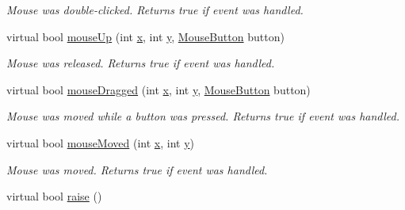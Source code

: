 \begin{DoxyCompactItemize}
\begin{DoxyCompactList}\small\item\em Mouse was double-\/clicked. Returns true if event was handled. \end{DoxyCompactList}\item 
\hypertarget{classGUI_1_1ToplevelWindow_ac6bba97e704f4a04ca37828ccf4b7061}{virtual bool \hyperlink{classGUI_1_1ToplevelWindow_ac6bba97e704f4a04ca37828ccf4b7061}{mouse\-Up} (int \hyperlink{classGUI_1_1Window_a6ca6a80ca00c9e1d8ceea8d3d99a657d}{x}, int \hyperlink{classGUI_1_1Window_a0ee8e923aff2c3661fc2e17656d37adf}{y}, \hyperlink{namespaceGUI_ad06082a7b02aa73697f39eb8e0856de9}{Mouse\-Button} button)}\label{classGUI_1_1ToplevelWindow_ac6bba97e704f4a04ca37828ccf4b7061}

\begin{DoxyCompactList}\small\item\em Mouse was released. Returns true if event was handled. \end{DoxyCompactList}\item 
\hypertarget{classGUI_1_1ToplevelWindow_ac75b6a6c8533ac9e8d0787a15fef9f2e}{virtual bool \hyperlink{classGUI_1_1ToplevelWindow_ac75b6a6c8533ac9e8d0787a15fef9f2e}{mouse\-Dragged} (int \hyperlink{classGUI_1_1Window_a6ca6a80ca00c9e1d8ceea8d3d99a657d}{x}, int \hyperlink{classGUI_1_1Window_a0ee8e923aff2c3661fc2e17656d37adf}{y}, \hyperlink{namespaceGUI_ad06082a7b02aa73697f39eb8e0856de9}{Mouse\-Button} button)}\label{classGUI_1_1ToplevelWindow_ac75b6a6c8533ac9e8d0787a15fef9f2e}

\begin{DoxyCompactList}\small\item\em Mouse was moved while a button was pressed. Returns true if event was handled. \end{DoxyCompactList}\item 
\hypertarget{classGUI_1_1ToplevelWindow_a0e4d1dbf1c44f8ac667eac8c35d24caa}{virtual bool \hyperlink{classGUI_1_1ToplevelWindow_a0e4d1dbf1c44f8ac667eac8c35d24caa}{mouse\-Moved} (int \hyperlink{classGUI_1_1Window_a6ca6a80ca00c9e1d8ceea8d3d99a657d}{x}, int \hyperlink{classGUI_1_1Window_a0ee8e923aff2c3661fc2e17656d37adf}{y})}\label{classGUI_1_1ToplevelWindow_a0e4d1dbf1c44f8ac667eac8c35d24caa}

\begin{DoxyCompactList}\small\item\em Mouse was moved. Returns true if event was handled. \end{DoxyCompactList}\item 
\hypertarget{classGUI_1_1ToplevelWindow_a630814c3f68da3b8e10cc9f257fef8e2}{virtual bool \hyperlink{classGUI_1_1ToplevelWindow_a630814c3f68da3b8e10cc9f257fef8e2}{raise} ()}\label{classGUI_1_1ToplevelWindow_a630814c3f68da3b8e10cc9f257fef8e2}


\end{DoxyCompactItemize}

